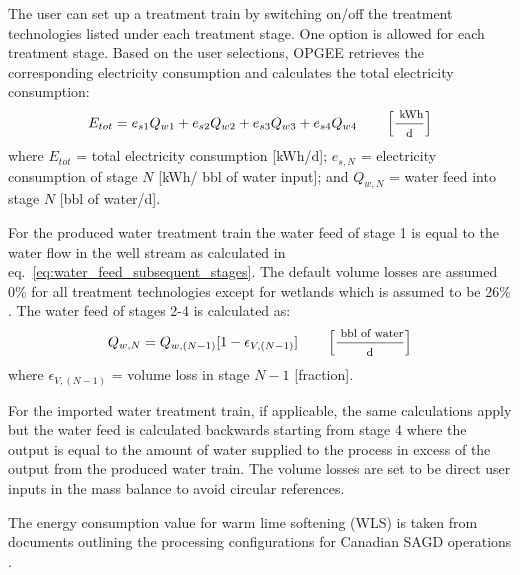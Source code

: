 \documentclass[11pt]{report}
\newcommand{\marg}[1]{{\footnotesize\textit{\textcolor{stanford}{'#1'}}}}
\newcommand{\marginnote}[1]{\marginpar{\marg{#1}}}
\begin{document}
The user can set up a treatment train by switching on/off the treatment technologies listed under each treatment stage. One option is allowed for each treatment stage. Based on the user selections, OPGEE retrieves the corresponding electricity consumption and calculates the total electricity consumption: \marginnote{Surface \\ Processing 2.3.1}
\begin{equation} \label{eq:water_treat_elec_consumption}
E_{tot} = e_{s1}Q_{w1}+e_{s2}Q_{w2}+e_{s3}Q_{w3}+e_{s4}Q_{w4} \quad\quad \begin{footnotesize}\left[ \frac{\text{ kWh}}{\text{d}} \right] \end{footnotesize}
\end{equation}
where $E_{tot}$ = total electricity consumption [kWh/d]; $e_{s,N}$ = electricity consumption of stage $N$ [kWh/ bbl of water input]; and $Q_{w,N}$ = water feed into stage $N$ [bbl of water/d].

For the produced water treatment train the water feed of stage 1 is equal to the water flow in the well stream as calculated in eq.\ \eqref{eq:water_feed_subsequent_stages}. The default volume losses are assumed 0\% for all treatment technologies except for wetlands which is assumed to be 26\% \cite{Vlasopoulos2006}. The water feed of stages 2-4 is calculated as: \marginnote{Surface \\ Processing 2.3.1 Figure}
\begin{equation} \label{eq:water_feed_subsequent_stages}
Q_{w,N} = Q_{w,(N-1)}[1-\epsilon_{V,(N-1)}] \quad\quad \begin{footnotesize}\left[ \frac{\text{ bbl of water}}{\text{d}} \right] \end{footnotesize}
\end{equation}
where $\epsilon_{V,(N-1)}$ = volume loss in stage $N-1$ [fraction].

For the imported water treatment train, if applicable, the same calculations apply but the water feed is calculated backwards starting from stage 4 where the output is equal to the amount of water supplied to the process in excess of the output from the produced water train. The volume losses are set to be direct user inputs in the mass balance to avoid circular references. 

The energy consumption value for warm lime softening (WLS) is taken from documents outlining the processing configurations for Canadian SAGD operations \cite{COSIA2014}.  
\end{document}
